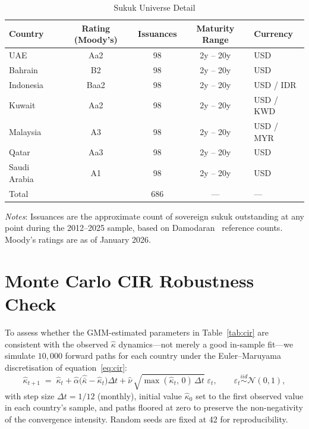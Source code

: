 \documentclass[12pt]{article}
\theoremstyle{plain}
\theoremstyle{definition}
\theoremstyle{remark}
\begin{document}
\begin{table}[htbp]
  \centering
  \caption{Sukuk Universe Detail}
  \label{tab:sukuk_detail}
  \begin{tabular}{lcccl}
    \toprule
    Country & Rating (Moody's) & Issuances & Maturity Range & Currency \\
    \midrule
    UAE          & Aa2 & 98 & 2y -- 20y & USD \\
    Bahrain      & B2  & 98 & 2y -- 20y & USD \\
    Indonesia    & Baa2 & 98 & 2y -- 20y & USD / IDR \\
    Kuwait       & Aa2 & 98 & 2y -- 20y & USD / KWD \\
    Malaysia     & A3  & 98 & 2y -- 20y & USD / MYR \\
    Qatar        & Aa3 & 98 & 2y -- 20y & USD \\
    Saudi Arabia & A1  & 98 & 2y -- 20y & USD \\
    \midrule
    Total        &     & 686 & --- & --- \\
    \bottomrule
  \end{tabular}
  \begin{minipage}{\textwidth}
    \smallskip
    \footnotesize
    \textit{Notes}: Issuances are the approximate count of sovereign sukuk
    outstanding at any point during the 2012--2025 sample, based on
    Damodaran~\cite{Damodaran2026} reference counts. Moody's ratings are
    as of January 2026.
  \end{minipage}
\end{table}

\section{Monte Carlo CIR Robustness Check}
\label{app:mc}

To assess whether the GMM-estimated parameters in Table~\ref{tab:cir} are
consistent with the observed $\hat{\kappa}$ dynamics---not merely a good
in-sample fit---we simulate $10{,}000$ forward paths for each country under the
Euler--Maruyama discretisation of equation~\eqref{eq:cir}:
\begin{equation}
  \hat{\kappa}_{t+1} \;=\;
    \hat{\kappa}_t
    + \hat{\alpha}\bigl(\hat{\bar{\kappa}} - \hat{\kappa}_t\bigr)\Delta t
    + \hat{\nu}\,\sqrt{\max(\hat{\kappa}_t,\,0)\,\Delta t}\;\varepsilon_t,
  \qquad \varepsilon_t \overset{iid}{\sim}\mathcal{N}(0,1),
  \label{eq:em_cir}
\end{equation}
with step size $\Delta t = 1/12$ (monthly), initial value $\hat{\kappa}_0$
set to the first observed value in each country's sample, and paths floored
at zero to preserve the non-negativity of the convergence intensity.
Random seeds are fixed at 42 for reproducibility.
\end{document}
